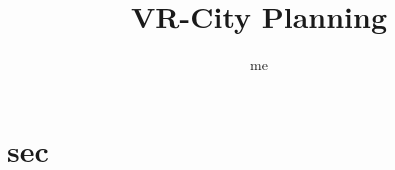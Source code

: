 \documentclass{article}
\title{VR-City Planning}
\author{me}
\begin{document}
\maketitle
\section{sec}
\end{document}
